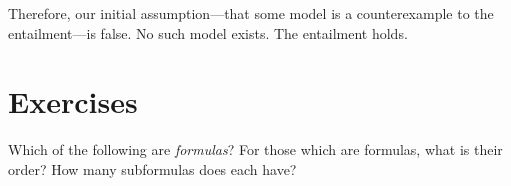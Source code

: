\begin{PROOF}
	 Therefore, our initial assumption---that some model is a counterexample to the entailment---is false.  No such model exists.  The entailment holds.	
	  
\end{PROOF}






\section{Exercises}

 Which of the following are \emph{formulas}? 
For those which are formulas, what is their order? 
How many subformulas does each have?
